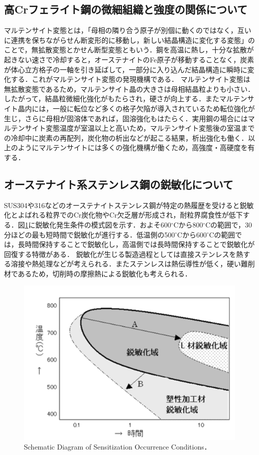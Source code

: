 \subsection{高Crフェライト鋼の微細組織と強度の関係について}
マルテンサイト変態とは，「母相の隣り合う原子が別個に動くのではなく，互いに連携を保ちながらせん断変形的に移動し，新しい結晶構造に変化する変態」のことで，無拡散変態とかせん断型変態ともいう\cite{マルテンサイト}．鋼を高温に熱し，十分な拡散が起きない速さで冷却すると，オーステナイトのFe原子が移動することなく，炭素が体心立方格子の一軸を引き延ばして，一部分に入り込んだ結晶構造に瞬時に変化する．これがマルテンサイト変態の発現機構である．
マルテンサイト変態は無拡散変態であるため，マルテンサイト晶の大きさは母相結晶粒よりも小さい．したがって，結晶粒微細化強化がもたらされ，硬さが向上する．またマルテンサイト晶内には，一般に転位など多くの格子欠陥が導入されているため転位強化が生じ，さらに母相が固溶体であれば，固溶強化もはたらく．実用鋼の場合にはマルテンサイト変態温度が室温以上と高いため，マルテンサイト変態後の室温までの冷却中に炭素の再配列，炭化物の析出などが起こる結果，析出強化も働く．以上のようにマルテンサイトには多くの強化機構が働くため，高強度・高硬度を有する．
\subsection{オーステナイト系ステンレス鋼の鋭敏化について}
SUS304や316などのオーステナイトステンレス鋼が特定の熱履歴を受けると鋭敏化とよばれる粒界でのCr炭化物やCr欠乏層が形成され，耐粒界腐食性が低下する．図\ref{fig:鋭敏化}に鋭敏化発生条件の模式図を示す．およそ600$^\circ$Cから800$^\circ$Cの範囲で，30分ほどの最も短時間で鋭敏化が進行する．低温側の500$^\circ$Cから600$^\circ$Cの範囲では，長時間保持することで鋭敏化し，高温側では長時間保持することで鋭敏化が回復する特徴がある．
鋭敏化が生じる製造過程としては直接ステンレスを熱する溶接や熱処理などが考えられる．またステンレスは熱伝導性が低く，硬い難削材であるため，切削時の摩擦熱による鋭敏化も考えられる．
\begin{figure}[htbp]
    \centering %
    \includegraphics[width=100truemm,clip]{fig/fig_鋭敏化曲線.png}
    \caption{Schematic Diagram of Sensitization Occurrence Conditions\cite{鋭敏化}．}
    \label{fig:鋭敏化}
\end{figure}
\clearpage
